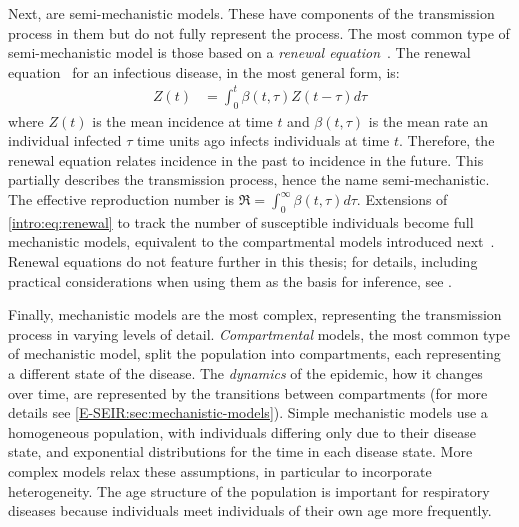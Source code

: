 \documentclass[thesis.tex]{subfiles}
\begin{document}
Next, are semi-mechanistic models.
These have components of the transmission process in them but do not fully represent the process.
The most common type of semi-mechanistic model is those based on a \emph{renewal equation}~\autocite{bhattSemimechanistic}.
The renewal equation~\autocite{fraserRenewal} for an infectious disease, in the most general form, is:
\begin{align}
    Z(t) &= \int_{0}^{t} \beta(t,\tau) Z(t-\tau) d \tau
    \label{intro:eq:renewal}
\end{align}
where $Z(t)$ is the mean incidence at time $t$ and $\beta(t, \tau)$ is the mean rate an individual infected $\tau$ time units ago infects individuals at time $t$.
Therefore, the renewal equation relates incidence in the past to incidence in the future.
This partially describes the transmission process, hence the name semi-mechanistic.
The effective reproduction number is $\Re = \int_0^\infty \beta(t, \tau) d\tau$.
Extensions of \cref{intro:eq:renewal} to track the number of susceptible individuals become full mechanistic models, equivalent to the compartmental models introduced next~\autocite{champredonEquivalence}.
Renewal equations do not feature further in this thesis; for details, including practical considerations when using them as the basis for inference, see \textcite{nashEstimating,gosticPractical}.

Finally, mechanistic models are the most complex, representing the transmission process in varying levels of detail.
\emph{Compartmental} models, the most common type of mechanistic model, split the population into compartments, each representing a different state of the disease.
The \emph{dynamics} of the epidemic, how it changes over time, are represented by the transitions between compartments (for more details see \cref{E-SEIR:sec:mechanistic-models}).
Simple mechanistic models use a homogeneous population, with individuals differing only due to their disease state, and exponential distributions for the time in each disease state.
More complex models relax these assumptions, in particular to incorporate heterogeneity.
The age structure of the population is important for respiratory diseases because individuals meet individuals of their own age more frequently.
\end{document}
